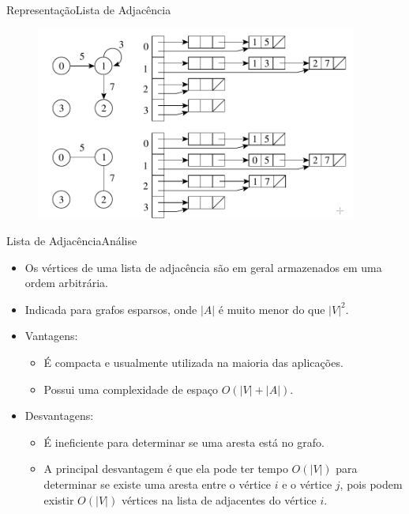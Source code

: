 \documentclass[aspectratio=169]{beamer}
\begin{document}
\begin{frame}{Representação}{Lista de Adjacência}
\begin{figure}[!h]
  \centering
  \includegraphics[width=300pt]{imagens/exemplo_lista_adjacencia.png}
  \label{fig_exemplo_lista_adjacencia}
\end{figure}
\end{frame}


\begin{frame}{Lista de Adjacência}{Análise}
\begin{itemize}
\item Os vértices de uma lista de adjacência são em geral armazenados em uma ordem arbitrária.
\item Indicada para grafos esparsos, onde $|A|$ é muito menor do que $|V|^2$.
\item {\color{blue} Vantagens}:
\begin{itemize}
\item É compacta e usualmente utilizada na maioria das aplicações.
\item Possui uma complexidade de espaço $O(|V| + |A|)$.
\end{itemize}
\item {\color{red} Desvantagens}:
\begin{itemize}
\item É ineficiente para determinar se uma aresta está no grafo.
\item A principal desvantagem é que ela pode ter tempo $O(|V|)$ para determinar se existe uma aresta entre o vértice $i$ e o vértice $j$, pois
podem existir $O(|V|)$ vértices na lista de adjacentes do vértice $i$.
\end{itemize}
\end{itemize}
\end{frame}
\end{document}
